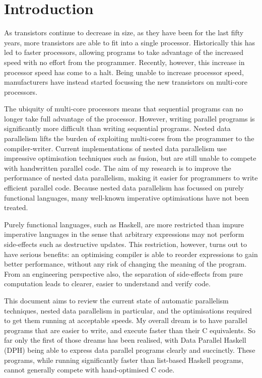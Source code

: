 
\section{Introduction}
As transistors continue to decrease in size, as they have been for the last fifty years, more transistors are able to fit into a single processor.
Historically this has led to faster processors, allowing programs to take advantage of the increased speed with no effort from the programmer.
Recently, however, this increase in processor speed has come to a halt.
Being unable to increase processor speed, manufacturers have instead started focussing the new transistors on multi-core processors.

The ubiquity of multi-core processors means that sequential programs can no longer take full advantage of the processor.
However, writing parallel programs is significantly more difficult than writing sequential programs.
Nested data parallelism lifts the burden of exploiting multi-cores from the programmer to the compiler-writer.
Current implementations of nested data parallelism use impressive optimisation techniques such as fusion, but are still unable to compete with handwritten parallel code.
The aim of my research is to improve the performance of nested data parallelism, making it easier for programmers to write efficient parallel code.
Because nested data parallelism has focussed on purely functional languages, many well-known imperative optimisations have not been treated.

Purely functional languages, such as Haskell, are more restricted than impure imperative languages
in the sense that arbitrary expressions may not perform side-effects such as destructive updates.
This restriction, however, turns out to have serious benefits:
an optimising compiler is able to reorder expressions to gain better performance,
without any risk of changing the meaning of the program.
From an engineering perspective also, the separation of side-effects from pure computation leads to clearer, easier to understand and verify code.

This document aims to review the current state of automatic parallelism techniques, nested data parallelism in particular,
and the optimisations required to get them running at acceptable speeds.
My overall dream is to have parallel programs that are easier to write, and execute faster than their C equivalents.
So far only the first of those dreams has been realised, with Data Parallel Haskell (DPH)
being able to express data parallel programs clearly and succinctly.
These programs, while running significantly faster than list-based Haskell programs, cannot generally compete with hand-optimised C code.
